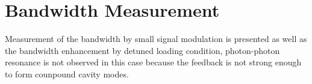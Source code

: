 

\section{Bandwidth Measurement}\label{sec:bandwidth_measurement}
Measurement of the bandwidth by small signal modulation is presented as well as the bandwidth enhancement by detuned loading condition, photon-photon resonance is not observed in this case because the feedback is not strong enough to form counpound cavity modes.





